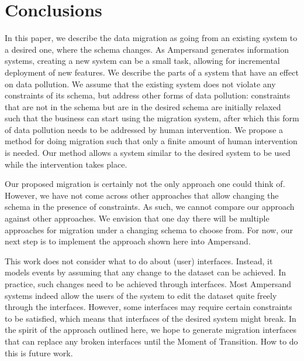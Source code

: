 \documentclass[runningheads]{llncs}
\begin{document}
\section{Conclusions}

   In this paper, we describe the data migration as going from an existing system to a desired one, where the schema changes.
   As Ampersand generates information systems, creating a new system can be a small task, allowing for incremental deployment of new features.
   We describe the parts of a system that have an effect on data pollution.
   We assume that the existing system does not violate any constraints of its schema, but address other forms of data pollution:
   constraints that are not in the schema but are in the desired schema are initially relaxed such that the business can start using the migration system, after which this form of data pollution needs to be addressed by human intervention.
   We propose a method for doing migration such that only a finite amount of human intervention is needed.
   Our method allows a system similar to the desired system to be used while the intervention takes place.

   Our proposed migration is certainly not the only approach one could think of.
   However, we have not come across other approaches that allow changing the schema in the presence of constraints.
   As such, we cannot compare our approach against other approaches.
   We envision that one day there will be multiple approaches for migration under a changing schema to choose from.
   For now, our next step is to implement the approach shown here into Ampersand.

   This work does not consider what to do about (user) interfaces.
   Instead, it models events by assuming that any change to the dataset can be achieved.
   In practice, such changes need to be achieved through interfaces.
   Most Ampersand systems indeed allow the users of the system to edit the dataset quite freely through the interfaces.
   However, some interfaces may require certain constraints to be satisfied, which means that interfaces of the desired system might break.
   In the spirit of the approach outlined here, we hope to generate migration interfaces that can replace any broken interfaces until the Moment of Transition.
   How to do this is future work.



\end{document}
